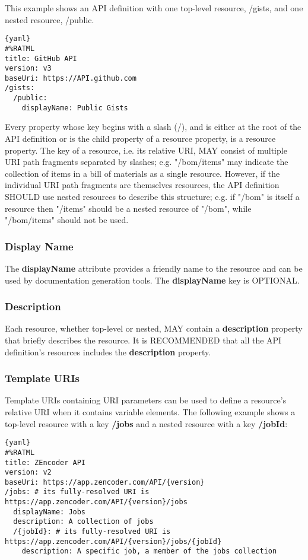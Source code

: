 This example shows an API definition with one top-level resource, /gists, and one nested resource, /public.

\begin{lstlisting}{yaml}
#%RATML
title: GitHub API
version: v3
baseUri: https://API.github.com
/gists:
  /public:
    displayName: Public Gists
\end{lstlisting}

Every property whose key begins with a slash (/), and is either at the root of the API definition or is the child property of a resource property, is a resource property. The key of a resource, i.e. its relative URI, MAY consist of multiple URI path fragments separated by slashes; e.g. "/bom/items" may indicate the collection of items in a bill of materials as a single resource. However, if the individual URI path fragments are themselves resources, the API definition SHOULD use nested resources to describe this structure; e.g. if "/bom" is itself a resource then "/items" should be a nested resource of "/bom", while "/bom/items" should not be used.

\subsubsection{Display Name}

The \textbf{displayName} attribute provides a friendly name to the resource and can be used by documentation generation tools. The \textbf{displayName} key is OPTIONAL.


\subsubsection{Description}

Each resource, whether top-level or nested, MAY contain a \textbf{description} property that briefly describes the resource. It is RECOMMENDED that all the API definition's resources includes the \textbf{description} property.

\subsubsection{Template URIs}

Template URIs containing URI parameters can be used to define a resource's relative URI when it contains variable elements.
The following example shows a top-level resource with a key \textbf{/jobs} and a nested resource with a key \textbf{/{jobId}}:

\begin{lstlisting}{yaml}
#%RATML
title: ZEncoder API
version: v2
baseUri: https://app.zencoder.com/API/{version}
/jobs: # its fully-resolved URI is https://app.zencoder.com/API/{version}/jobs
  displayName: Jobs
  description: A collection of jobs
  /{jobId}: # its fully-resolved URI is https://app.zencoder.com/API/{version}/jobs/{jobId}
    description: A specific job, a member of the jobs collection
\end{lstlisting}

